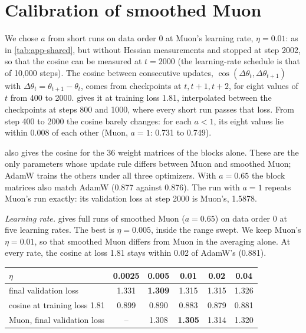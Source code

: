 \section{Calibration of smoothed Muon}
\label{app:calib}

We chose $a$ from short runs on data order 0 at Muon's learning rate, $\eta=0.01$: as in \cref{tab:app-shared}, but
without Hessian measurements and stopped at step 2002, so that the cosine can be measured at $t=2000$ (the learning-rate schedule is that of 10{,}000 steps). The cosine
between consecutive updates, $\cos(\Delta\theta_t,\Delta\theta_{t+1})$ with $\Delta\theta_t=\theta_{t+1}-\theta_t$,
comes from checkpoints at $t,t+1,t+2$, for eight values of $t$ from 400 to 2000.  gives it at training
loss 1.81, interpolated between the checkpoints at steps 800 and 1000, where every short run passes that loss. From step
400 to 2000 the cosine barely changes: for each $a<1$, its eight values lie within 0.008 of each other (Muon, $a=1$:
0.731 to 0.749).

 also gives the cosine for the 36 weight matrices of the blocks alone. These are the only parameters
whose update rule differs between Muon and smoothed Muon; AdamW trains the others under all three optimizers. With
$a=0.65$ the block matrices also match AdamW (0.877 against 0.876). The run with $a=1$ repeats Muon's run exactly: its
validation loss at step 2000 is Muon's, 1.5878.

\emph{Learning rate.}  gives full runs of smoothed Muon ($a=0.65$) on data order 0 at five learning
rates. The best is $\eta=0.005$, inside the range swept. We keep Muon's $\eta=0.01$, so that smoothed Muon differs from
Muon in the averaging alone. At every rate, the cosine at loss 1.81 stays within 0.02 of AdamW's (0.881).

\begin{center}\small
\captionsetup{type=table}
\caption{Learning rate of smoothed Muon ($a=0.65$, data order 0): final validation loss and cosine between
consecutive updates at training loss 1.81. Last row: Muon's own sweep, from the CE report (its fifth rate, 0.08, is not shown).}
\label{tab:app-lr}
\begin{tabular}{@{}l|ccccc@{}}
$\eta$ & 0.0025 & 0.005 & 0.01 & 0.02 & 0.04 \\
\hline
final validation loss & 1.331 & \textbf{1.309} & 1.315 & 1.315 & 1.326 \\
cosine at training loss 1.81 & 0.899 & 0.890 & 0.883 & 0.879 & 0.881 \\
\hline
Muon, final validation loss & -- & 1.308 & \textbf{1.305} & 1.314 & 1.320 \\
\end{tabular}
\end{center}


